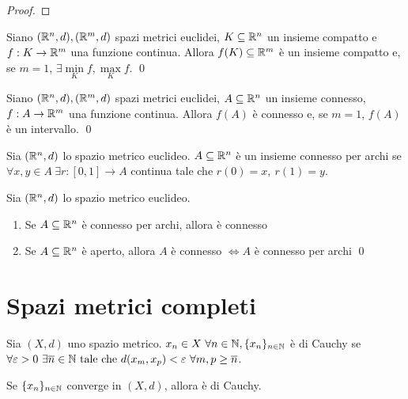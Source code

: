 \begin{proof}
\end{proof}

\begin{theorem}
    [di Weierstrass]
    Siano $(\mathbb{R}^n, d), (\mathbb{R}^m, d)$ spazi metrici euclidei, $K \subseteq \mathbb{R}^n$ un insieme compatto e $f: K \to \mathbb{R}^m$ una funzione continua. Allora $f(K) \subseteq \mathbb{R}^m$ è un insieme compatto e, se $m=1$, $\exists \min\limits_Kf, \max\limits_Kf$.
    \qed
\end{theorem}

\begin{theorem}
    [di Bolzano]
    Siano $(\mathbb{R}^n, d), (\mathbb{R}^m, d)$ spazi metrici euclidei, $A \subseteq \mathbb{R}^n$ un insieme connesso, $f: A \to \mathbb{R}^m$ una funzione continua. Allora $f(A)$ è connesso e, se $m=1$, $f(A)$ è un intervallo.
    \qed
\end{theorem}

\begin{definition}
    Sia $(\mathbb{R}^n, d)$ lo spazio metrico euclideo. $A \subseteq \mathbb{R}^n$ è un insieme connesso per archi se $\forall x, y \in A \ \exists r: [0,1] \to A$ continua tale che $r(0)=x,\ r(1)=y$.
\end{definition}

\begin{theorem}
    Sia $(\mathbb{R}^n, d)$ lo spazio metrico euclideo.
    \begin{enumerate}
        \item Se $A \subseteq \mathbb{R}^n$ è connesso per archi, allora è connesso
        \item Se $A \subseteq \mathbb{R}^n$ è aperto, allora $A$ è connesso $\iff A$ è connesso per archi
        \qed
    \end{enumerate}
\end{theorem}

\section{Spazi metrici completi}

\begin{definition}
    Sia $(X, d)$ uno spazio metrico. $x_n \in X \ \forall n \in \mathbb{N}, \{x_n\}_{n \in \mathbb{N}}$ è di Cauchy se $\forall \varepsilon > 0 \ \exists \overline{n} \in \mathbb{N} \text{ tale che } d(x_m, x_p) < \varepsilon \ \forall m, p \geq \overline{n}$.
\end{definition}

\begin{theorem}
    Se $\{x_n\}_{n \in \mathbb{N}}$ converge in $(X, d)$, allora è di Cauchy.
\end{theorem}

